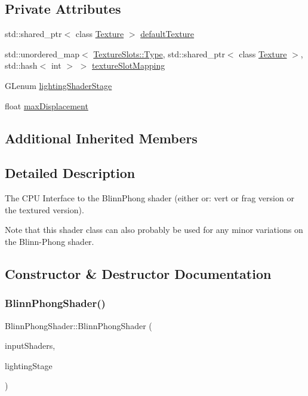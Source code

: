 \subsection*{Private Attributes}
\begin{DoxyCompactItemize}
\item
std\+::shared\+\_\+ptr$<$ class \hyperlink{class_texture}{Texture} $>$ \hyperlink{class_blinn_phong_shader_a2335cf5c2d95098a94f9f2e888b329f3}{default\+Texture}
\item
std\+::unordered\+\_\+map$<$ \hyperlink{struct_blinn_phong_shader_1_1_texture_slots_a98940b49ba855ee47d61a6243c05c34d}{Texture\+Slots\+::\+Type}, std\+::shared\+\_\+ptr$<$ class \hyperlink{class_texture}{Texture} $>$, std\+::hash$<$ int $>$ $>$ \hyperlink{class_blinn_phong_shader_a7467b1de2650fd04ea63ed5f8aeedc59}{texture\+Slot\+Mapping}
\item
G\+Lenum \hyperlink{class_blinn_phong_shader_a942775771a09fd5553409bdb44ec32ac}{lighting\+Shader\+Stage}
\item
float \hyperlink{class_blinn_phong_shader_a9e5e58c4901d48b315e94d15fd504a8c}{max\+Displacement}
\end{DoxyCompactItemize}
\subsection*{Additional Inherited Members}


\subsection{Detailed Description}
The C\+PU Interface to the Blinn\+Phong shader (either or\+: vert or frag version or the textured version).

Note that this shader class can also probably be used for any minor variations on the Blinn-\/\+Phong shader.

\subsection{Constructor \& Destructor Documentation}
\hypertarget{class_blinn_phong_shader_a2a13c983ffcc8d95ffe1a431bb2b1fb6}{}\label{class_blinn_phong_shader_a2a13c983ffcc8d95ffe1a431bb2b1fb6}
\subsubsection{\texorpdfstring{Blinn\+Phong\+Shader()}{BlinnPhongShader()}}
{\footnotesize\ttfamily Blinn\+Phong\+Shader\+::\+Blinn\+Phong\+Shader (\begin{DoxyParamCaption}\item[{const std\+::unordered\+\_\+map$<$ G\+Lenum, std\+::string $>$ \&}]{input\+Shaders,  }\item[{G\+Lenum}]{lighting\+Stage }\end{DoxyParamCaption})}



